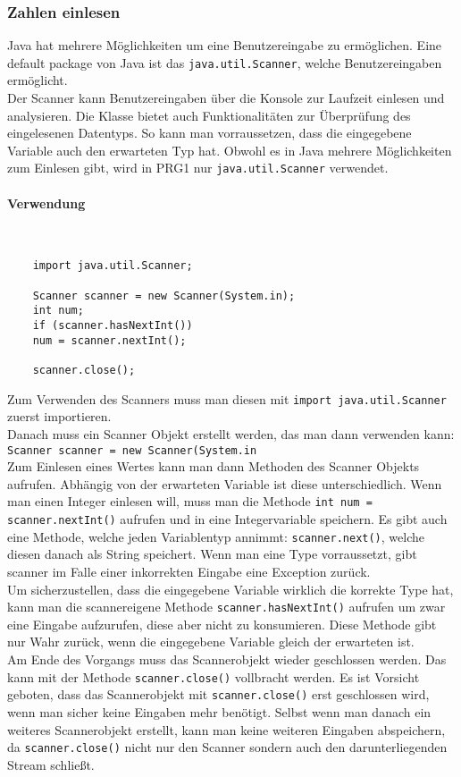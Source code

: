 \documentclass{article}
\newcommand{\paragraphlb}[1]{\paragraph{#1}\mbox{}\\}
\begin{document}
	\subsubsection{Zahlen einlesen}
	Java hat mehrere Möglichkeiten um eine Benutzereingabe zu ermöglichen. Eine default package von Java ist das \verb|java.util.Scanner|, welche Benutzereingaben ermöglicht. \\
	Der Scanner kann Benutzereingaben über die Konsole zur Laufzeit einlesen und analysieren. Die Klasse bietet auch Funktionalitäten zur Überprüfung des eingelesenen Datentyps. So kann man vorraussetzen, dass die eingegebene Variable auch den erwarteten Typ hat. Obwohl es in Java mehrere Möglichkeiten zum Einlesen gibt, wird in PRG1 nur \verb|java.util.Scanner| verwendet. \\
	\paragraphlb{Verwendung}
	\begin{verbatim}
	import java.util.Scanner;

	Scanner scanner = new Scanner(System.in);
	int num;
	if (scanner.hasNextInt())
	num = scanner.nextInt();

	scanner.close();
	\end{verbatim}
	Zum Verwenden des Scanners muss man diesen mit \verb|import java.util.Scanner| zuerst importieren. \\
	Danach muss ein Scanner Objekt erstellt werden, das man dann verwenden kann: \verb|Scanner scanner = new Scanner(System.in| \\
	Zum Einlesen eines Wertes kann man dann Methoden des Scanner Objekts aufrufen. Abhängig von der erwarteten Variable ist diese unterschiedlich. Wenn man einen Integer einlesen will, muss man die Methode \verb|int num = scanner.nextInt()| aufrufen und in eine Integervariable speichern. Es gibt auch eine Methode, welche jeden Variablentyp annimmt: \verb|scanner.next()|, welche diesen danach als String speichert. Wenn man eine Type vorraussetzt, gibt scanner im Falle einer inkorrekten Eingabe eine Exception zurück.\\
	Um sicherzustellen, dass die eingegebene Variable wirklich die korrekte Type hat, kann man die scannereigene Methode \verb|scanner.hasNextInt()| aufrufen um zwar eine Eingabe aufzurufen, diese aber nicht zu konsumieren. Diese Methode gibt nur Wahr zurück, wenn die eingegebene Variable gleich der erwarteten ist. \\
	Am Ende des Vorgangs muss das Scannerobjekt wieder geschlossen werden. Das kann mit der Methode \verb|scanner.close()| vollbracht werden. Es ist Vorsicht geboten, dass das Scannerobjekt mit \verb|scanner.close()| erst geschlossen wird, wenn man sicher keine Eingaben mehr benötigt. Selbst wenn man danach ein weiteres Scannerobjekt erstellt, kann man keine weiteren Eingaben abspeichern, da \verb|scanner.close()| nicht nur den Scanner sondern auch den darunterliegenden Stream schließt.
\end{document}

